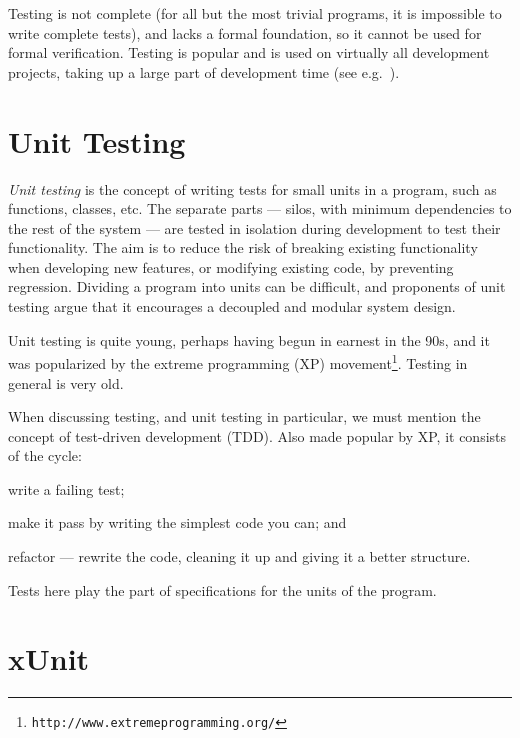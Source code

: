 \documentclass[a4paper,11pt]{kth-mag}
\theoremstyle{definition}
\begin{document}
Testing is not complete (for all but the most trivial programs, it is
impossible to write complete tests), and lacks a formal foundation, so it
cannot be used for formal verification. Testing is popular and is used on
virtually all development projects, taking up a large part of development time
(see e.g.\ \cite{brooks75mythicalmanmonth}).


\section{Unit Testing}

\textit{Unit testing} is the concept of writing tests for small units in a
program, such as functions, classes, etc. The separate parts --- silos, with
minimum dependencies to the rest of the system --- are tested in isolation
during development to test their functionality. The aim is to reduce the risk
of breaking existing functionality when developing new features, or modifying
existing code, by preventing regression. Dividing a program into units can be
difficult, and proponents of unit testing argue that it encourages a decoupled
and modular system design.

Unit testing is quite young, perhaps having begun in earnest in the 90s, and it
was popularized by the extreme programming (XP)
movement\footnote{\texttt{http://www.extremeprogramming.org/}}. Testing in
general is very old.

When discussing testing, and unit testing in particular, we must mention the
concept of test-driven development (TDD). Also made popular by XP, it consists
of the cycle:
\begin{inparaenum}[1\upshape)]
  \item write a failing test;
  \item make it pass by writing the simplest code you can; and
  \item refactor --- rewrite the code, cleaning it up and giving it a better
    structure.
\end{inparaenum}
Tests here play the part of specifications for the units of the program.


\section{xUnit} \label{section-xunit}
\end{document}
